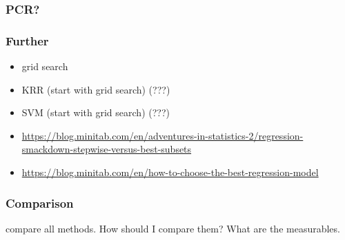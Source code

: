 \subsubsection{PCR?}


\subsubsection{Further}
\begin{itemize}
    \item grid search
    \item KRR (start with grid search) (???)
    \item SVM (start with grid search) (???)
    \item \url{https://blog.minitab.com/en/adventures-in-statistics-2/regression-smackdown-stepwise-versus-best-subsets}
    \item \url{https://blog.minitab.com/en/how-to-choose-the-best-regression-model}
\end{itemize}

\subsubsection{Comparison} 
compare all methods. 
How should I compare them? 
What are the measurables. 


